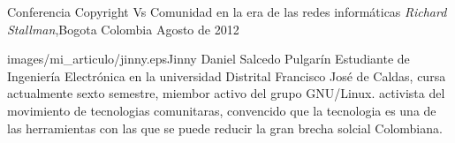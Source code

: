 \begin{multicols}{2}

\begin{bibliografia}
Conferencia Copyright Vs Comunidad en la era de las redes informáticas \emph{Richard Stallman},Bogota Colombia Agosto de 2012
\end{bibliografia} 

\begin{biografia}{images/mi_articulo/jinny.eps}{Jinny Daniel Salcedo Pulgarín} %
Estudiante de Ingeniería Electrónica en la universidad Distrital Francisco José de Caldas, cursa actualmente sexto semestre, miembor activo del grupo GNU/Linux. activista del movimiento de tecnologias comunitaras, convencido que la tecnologia es una de las herramientas con las que se puede reducir la gran brecha solcial Colombiana.
\end{biografia}

\end{multicols} %


\clearpage
\pagebreak
